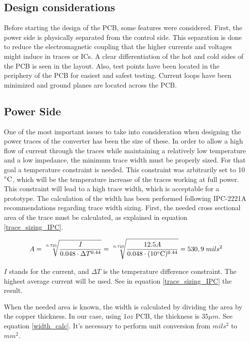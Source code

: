 \subsection{Design considerations} \label{PCB_Considerations}
Before starting the design of the PCB, some features were considered. First, the power side is physically separated from the control side. This separation is done to reduce the electromagnetic coupling that the higher currents and voltages might induce in traces or ICs. A clear differentiation of the hot and cold sides of the PCB is seen in the layout.  Also, test points have been located in the periphery of the PCB for easiest and safest testing. Current loops have been minimized and ground planes are located across the PCB.

\subsection{Power Side} \label{PCB_Power}
One of the most important issues to take into consideration when designing the power traces of the converter has been the size of these. In order to allow a high flow of current through the traces while maintaining a relatively low temperature and a low impedance, the minimum trace width must be properly sized. For that goal a temperature constraint is needed. This constraint was arbitrarily set to 10$\decC$, which will be the temperature increase of the traces working at full power. This constraint will lead to a high trace width, which is acceptable for a prototype.
The calculation of the width has been performed following IPC-2221A\cite{PCB_standard} recommendations regarding trace width sizing. First, the needed cross sectional area of the trace must be calculated, as explained in equation \ref{trace_sizing_IPC}.

\begin{equation} \label{trace_sizing_IPC}
A = \sqrt[\leftroot{-2}\uproot{2}0.725]{\frac{I}{0.048\cdot \Delta T^{0.44}}} = \sqrt[\leftroot{-2}\uproot{2}0.725]{\frac{12.5 A}{0.048\cdot (10\decC)^{0.44}}} = 530,9 \; mils^2
\end{equation}

 $I$ stands for the current, and $\Delta T$ is the temperature difference constraint. The highest average current will be used. See in equation \ref{trace_sizing_IPC} the result.
 
When the needed area is known, the width is calculated by dividing the area by the copper thickness. In our case, using $1 oz$ PCB, the thickness is $35 \mu m$. See equation \ref{width_calc}. It's necessary to perform unit conversion from $mils^2$ to $mm^2$.

